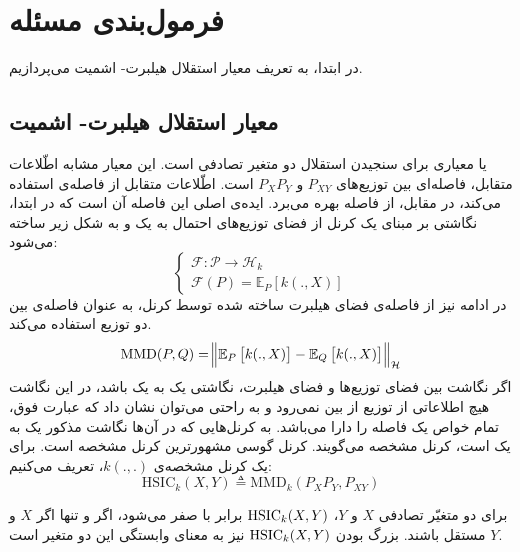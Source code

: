 
\chapter{فرمول‌بندی مسئله}
در ابتدا، به تعریف  معیار استقلال هیلبرت- اشمیت
\lr{($\HSIC$)}
می‌پردازیم.
\section{معیار استقلال هیلبرت- اشمیت
	\lr{($\HSIC$)}
}

یا 
\lr{$\HSIC$}
معیاری برای سنجیدن استقلال دو متغیر تصادفی است. این معیار مشابه اطّلاعات متقابل، فاصله‌ای بین توزیع‌های
$P_{XY}$
و 
$P_XP_Y$
است. اطّلاعات متقابل از فاصله‌ی 
استفاده می‌کند، در مقابل،
از فاصله 
بهره می‌برد. ایده‌ی اصلی این فاصله آن است که در ابتدا، نگاشتی بر مبنای یک کرنل از فضای توزیع‌های احتمال به یک 
و به شکل زیر ساخته می‌شود:
\begin{equation}
\begin{cases}
\mathcal{F}: \mathcal{P} \to \mathcal{H}_k\\
\mathcal{F}(P) = \mathbb{E}_{P}\left[ k(., X)\right]
\end{cases}
\end{equation}
در ادامه نیز از فاصله‌ی فضای هیلبرت ساخته شده توسط کرنل، به عنوان فاصله‌ی بین دو توزیع استفاده می‌کند.
\begin{equation}
\mathrm{MMD}(P, Q) = \norm{\mathbb{E}_{P}\left[ k(., X)\right] - \mathbb{E}_{Q}\left[ k(., X)\right]}_\mathcal{H}
\end{equation}
اگر نگاشت بین فضای توزیع‌ها و فضای هیلبرت، نگاشتی یک به یک باشد، در این نگاشت هیچ اطلاعاتی از توزیع از بین نمی‌رود و به راحتی می‌توان نشان داد که عبارت فوق، تمام خواص یک فاصله را دارا می‌باشد. به کرنل‌هایی که در آن‌ها نگاشت مذکور یک به یک است، کرنل مشخصه می‌گویند. کرنل گوسی مشهور‌ترین کرنل مشخصه است. برای یک کرنل مشخصه‌ی 
$k(., .)$،
تعریف می‌کنیم:
\begin{equation}
\mathrm{HSIC}_k(X, Y) \triangleq \mathrm{MMD}_k(P_XP_Y, P_{XY})
\end{equation}

برای دو متغیّر تصادفی 
$X$
و 
$Y$،
$\mathrm{HSIC}_k(X, Y)$
برابر با صفر می‌شود، اگر و تنها اگر $X$ و 
$Y$
مستقل باشند. بزرگ‌‌ بودن $\mathrm{HSIC}_k(X, Y)$
نیز به معنای وابستگی این دو متغیر است.
